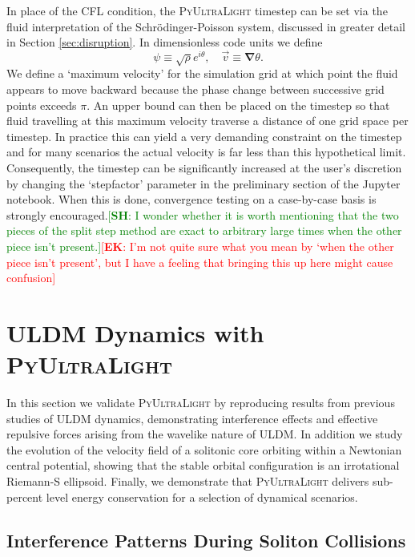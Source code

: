 \documentclass[a4paper,11pt]{article}
\newcommand{\PyUltraLight}{\textsc{PyUltraLight}\xspace}
\newcommand{\ek}[1]{\textcolor{red}{[{\bf EK}: #1]}}
\newcommand{\sh}[1]{\textcolor{green}{[{\bf SH}: #1]}}
\begin{document}
In place of the CFL condition, the \PyUltraLight timestep can be set via the fluid interpretation of the Schr{\"o}dinger-Poisson system, discussed in greater detail in Section \ref{sec:disruption}. In dimensionless code units we define 
\begin{equation}\label{eq:madelung}
    \psi\equiv\sqrt{\rho}e^{i\theta}, \quad \vec{v}\equiv\boldsymbol{\nabla}\theta.
\end{equation}
We define a `maximum velocity' for the simulation grid at which point the fluid appears to move backward because the phase change between successive grid points exceeds $\pi$. An upper bound can then be placed on the timestep so that fluid travelling at this maximum  velocity traverse a distance of one grid space per timestep.  In practice this can yield a very demanding constraint on the timestep and for many scenarios the actual velocity is far less than this hypothetical limit. Consequently, the timestep can be  significantly increased at the user's discretion by changing the `step\textunderscore factor' parameter in the preliminary section of the Jupyter notebook. When this is done, convergence testing on a case-by-case basis is strongly encouraged.\sh{I wonder whether it is worth mentioning that the two pieces of the split step method are exact to arbitrary large times when the other piece isn't present.}\ek{I'm not quite sure what you mean by `when the other piece isn't present', but I have a feeling that bringing this up here might cause confusion}


\section{ULDM Dynamics with \PyUltraLight}\label{sec:test}

In this section we validate \PyUltraLight by reproducing results from previous studies of ULDM dynamics, demonstrating interference effects and effective repulsive forces arising from the wavelike nature of ULDM. In addition we study the evolution of the velocity field of a solitonic core orbiting within a Newtonian central potential, showing that the stable orbital configuration is an irrotational Riemann-S ellipsoid. Finally, we demonstrate that \PyUltraLight delivers sub-percent level energy conservation for a selection of dynamical scenarios.

\subsection{Interference Patterns During Soliton Collisions}\label{sec:interference}
\end{document}
